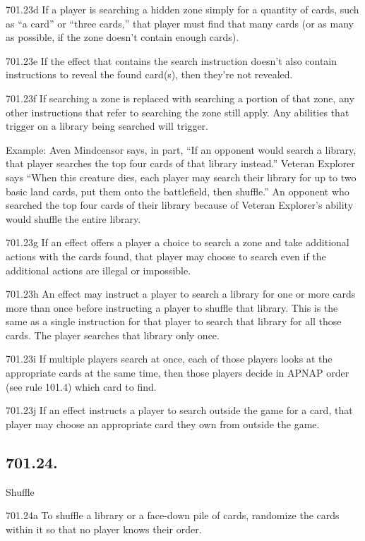 701.23d If a player is searching a hidden zone simply for a quantity of cards, such as “a card” or “three cards,” that player must find that many cards (or as many as possible, if the zone doesn’t contain enough cards).

701.23e If the effect that contains the search instruction doesn’t also contain instructions to reveal the found card(s), then they’re not revealed.

701.23f If searching a zone is replaced with searching a portion of that zone, any other instructions that refer to searching the zone still apply. Any abilities that trigger on a library being searched will trigger.

Example: Aven Mindcensor says, in part, “If an opponent would search a library, that player searches the top four cards of that library instead.” Veteran Explorer says “When this creature dies, each player may search their library for up to two basic land cards, put them onto the battlefield, then shuffle.” An opponent who searched the top four cards of their library because of Veteran Explorer’s ability would shuffle the entire library.

701.23g If an effect offers a player a choice to search a zone and take additional actions with the cards found, that player may choose to search even if the additional actions are illegal or impossible.

701.23h An effect may instruct a player to search a library for one or more cards more than once before instructing a player to shuffle that library. This is the same as a single instruction for that player to search that library for all those cards. The player searches that library only once.

701.23i If multiple players search at once, each of those players looks at the appropriate cards at the same time, then those players decide in APNAP order (see rule 101.4) which card to find.

701.23j If an effect instructs a player to search outside the game for a card, that player may choose an appropriate card they own from outside the game.

\subsection*{701.24.}
Shuffle

701.24a To shuffle a library or a face-down pile of cards, randomize the cards within it so that no player knows their order.

